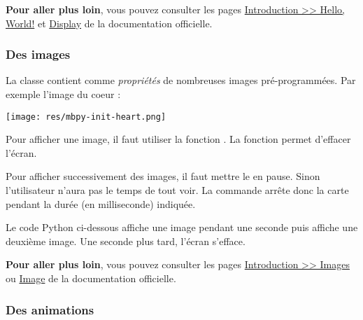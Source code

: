 \begin{methode}
\end{methode}

\begin{remarque}
\textbf{Pour aller plus loin}, vous pouvez consulter les pages \href{https://microbit-micropython.readthedocs.io/fr/latest/tutorials/hello.html}{Introduction >> Hello, World!} et \href{https://microbit-micropython.readthedocs.io/fr/latest/display.html}{Display} de la documentation officielle.
\end{remarque}


\subsubsection{Des images}

La classe  contient comme \emph{propriétés} de nombreuses images pré-programmées. Par exemple l'image du coeur : 

\begin{center}
    \texttt{[image: res/mbpy-init-heart.png]}
\end{center}

Pour afficher une image, il faut utiliser la fonction .
La fonction  permet d'effacer l'écran.

Pour afficher successivement des images, il faut mettre le \mb en pause. Sinon l'utilisateur n'aura pas le temps de tout voir. La commande  arrête donc la carte pendant la durée (en milliseconde) indiquée.

\begin{methode}
Le code Python ci-dessous affiche une image pendant une seconde puis affiche une deuxième image. Une seconde plus tard, l'écran s'efface.

\end{methode}

\begin{remarque}
\textbf{Pour aller plus loin}, vous pouvez consulter les pages  \href{https://microbit-micropython.readthedocs.io/fr/latest/tutorials/images.html}{Introduction >> Images} ou \href{https://microbit-micropython.readthedocs.io/fr/latest/image.html}{Image} de la documentation officielle.
\end{remarque}


\subsubsection{Des animations}

